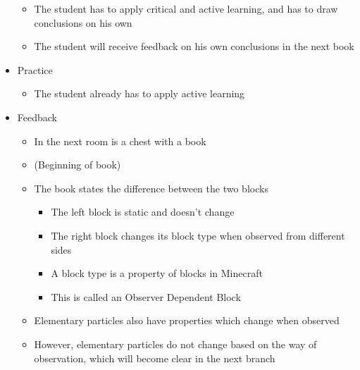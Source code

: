 \documentclass[11pt,twoside]{report} %
\begin{document}
\begin{itemize}
\begin{itemize}
		\item The student has to apply critical and active learning, and has to draw conclusions on his own
		\item The student will receive feedback on his own conclusions in the next book
	\end{itemize}
	\item Practice
	\begin{itemize}
		\item The student already has to apply active learning
	\end{itemize}
	\item Feedback
	\begin{itemize}
		\item In the next room is a chest with a book
		\item (Beginning of book)
		\item The book states the difference between the two blocks
		\begin{itemize}
			\item The left block is static and doesn't change
			\item The right block changes its block type when observed from different sides
			\item A block type is a property of blocks in Minecraft
			\item This is called an Observer Dependent Block
		\end{itemize}
		\item Elementary particles also have properties which change when observed
		\item However, elementary particles do not change based on the way of observation, which will become clear in the next branch
	\end{itemize}
\end{itemize}
\end{document}
